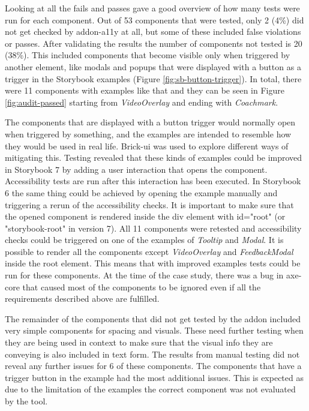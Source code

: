 \documentclass{master_thesis}
\begin{document}

Looking at all the fails and passes gave a good overview of how many tests were run for each component. Out of 53 components that were tested, only 2 (4\%) did not get checked by addon-a11y at all, but some of these included false violations or passes. After validating the results the number of components not tested is 20 (38\%). This included components that become visible only when triggered by another element, like modals and popups that were displayed with a button as a trigger in the Storybook examples (Figure \ref{fig:sb-button-trigger}). In total, there were 11 components with examples like that and they can be seen in Figure \ref{fig:audit-passed} starting from \textit{VideoOverlay} and ending with \textit{Coachmark}.

The components that are displayed with a button trigger would normally open when triggered by something, and the examples are intended to resemble how they would be used in real life. Brick-ui was used to explore different ways of mitigating this. Testing revealed that these kinds of examples could be improved in Storybook 7 by adding a user interaction that opens the component. Accessibility tests are run after this interaction has been executed. In Storybook 6 the same thing could be achieved by opening the example manually and triggering a rerun of the accessibility checks. It is important to make sure that the opened component is rendered inside the div element with id="root" (or "storybook-root" in version 7). All 11 components were retested and accessibility checks could be triggered on one of the examples of \textit{Tooltip} and \textit{Modal}. It is possible to render all the components except \textit{VideoOverlay} and \textit{FeedbackModal} inside the root element. This means that with improved examples tests could be run for these components. At the time of the case study, there was a bug in axe-core that caused most of the components to be ignored even if all the requirements described above are fulfilled.

The remainder of the components that did not get tested by the addon included very simple components for spacing and visuals. These need further testing when they are being used in context to make sure that the visual info they are conveying is also included in text form. The results from manual testing did not reveal any further issues for 6 of these components. The components that have a trigger button in the example had the most additional issues. This is expected as due to the limitation of the examples the correct component was not evaluated by the tool.
\end{document}
